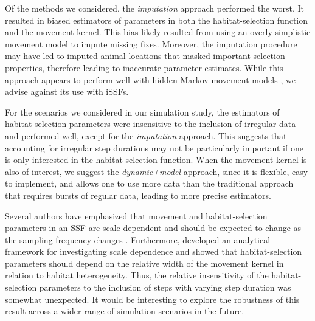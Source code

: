 \documentclass[abstract=on,10pt,a4paper,bibliography=totocnumbered]{article}
\begin{document}
Of the methods we considered, the \textit{imputation} approach performed the
worst. It resulted in biased estimators of parameters in both the
habitat-selection function and the movement kernel. This bias likely resulted
from using an overly simplistic movement model to impute missing fixes.
Moreover, the imputation procedure may have led to imputed animal locations that
masked important selection properties, therefore leading to inaccurate parameter
estimates. While this approach appears to perform well with hidden Markov
movement models \citep{McClintock.2017}, we advise against its use with iSSFs.

For the scenarios we considered in our simulation study, the estimators of
habitat-selection parameters were insensitive to the inclusion of irregular data
and performed well, except for the \textit{imputation} approach. This suggests
that accounting for irregular step durations may not be particularly important
if one is only interested in the habitat-selection function. When the movement
kernel is also of interest, we suggest the \textit{dynamic+model} approach,
since it is flexible, easy to implement, and allows one to use more data than
the traditional approach that requires bursts of regular data, leading to more
precise estimators.

Several authors have emphasized that movement and habitat-selection parameters
in an SSF are scale dependent and should be expected to change as the sampling
frequency changes \citep[see for example][]{Avgar.2016, Signer.2017,
Fieberg.2021}. Furthermore, \citet{Barnett.2008} developed an analytical
framework for investigating scale dependence and showed that habitat-selection
parameters should depend on the relative width of the movement kernel in
relation to habitat heterogeneity. Thus, the relative insensitivity of the
habitat-selection parameters to the inclusion of steps with varying step
duration was somewhat unexpected. It would be interesting to explore the
robustness of this result across a wider range of simulation scenarios in the
future.
\end{document}
